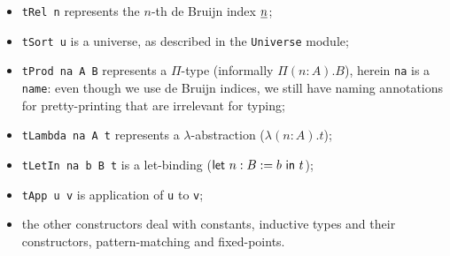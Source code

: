 \begin{itemize}
  \item \texttt{tRel n} represents the \(n\)-th de Bruijn index
  \(\underline{n}\);
  \item \texttt{tSort u} is a universe, as described in the
  \texttt{Universe} module;
  \item \texttt{tProd na A B} represents a \(\Pi\)-type
  (informally \(\Pi (n:A). B\)), herein \texttt{na} is a
  \texttt{name}: even though we use de Bruijn indices, we still have
  naming annotations for pretty-printing that are irrelevant for typing;
  \item \texttt{tLambda na A t} represents a \(\lambda\)-abstraction
  (\(\lambda (n:A).t\));
  \item \texttt{tLetIn na b B t} is a let-binding
  (\(\mathsf{let}\ n : B := b\ \mathsf{in}\ t\));
  \item \texttt{tApp u v} is application of \texttt{u} to
  \texttt{v};
  \item the other constructors deal with constants, inductive types and their
  constructors, pattern-matching and fixed-points.
\end{itemize}

